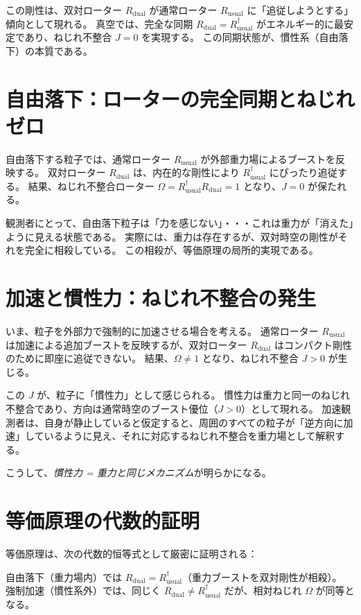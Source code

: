 \documentclass[dvipdfmx,a4paper]{jsbook}
\theoremstyle{definition}
\theoremstyle{remark}
\begin{document}
この剛性は、双対ローター $R_\text{dual}$ が通常ローター $R_\text{usual}$ に「追従しようとする」傾向として現れる。  
真空では、完全な同期 $R_\text{dual} = R_\text{usual}^\dagger$ がエネルギー的に最安定であり、ねじれ不整合 $J = 0$ を実現する。  
この同期状態が、慣性系（自由落下）の本質である。

\section{自由落下：ローターの完全同期とねじれゼロ}
\label{sec:free-fall}

自由落下する粒子では、通常ローター $R_\text{usual}$ が外部重力場によるブーストを反映する。  
双対ローター $R_\text{dual}$ は、内在的な剛性により $R_\text{usual}^\dagger$ にぴったり追従する。  
結果、ねじれ不整合ローター $\Omega = R_\text{usual}^\dagger R_\text{dual} = 1$ となり、$J = 0$ が保たれる。  

観測者にとって、自由落下粒子は「力を感じない」・・・これは重力が「消えた」ように見える状態である。  
実際には、重力は存在するが、双対時空の剛性がそれを完全に相殺している。  
この相殺が、等価原理の局所的実現である。

\section{加速と慣性力：ねじれ不整合の発生}
\label{sec:acceleration-inertia}

いま、粒子を外部力で強制的に加速させる場合を考える。  
通常ローター $R_\text{usual}$ は加速による追加ブーストを反映するが、双対ローター $R_\text{dual}$ はコンパクト剛性のために即座に追従できない。  
結果、$\Omega \neq 1$ となり、ねじれ不整合 $J > 0$ が生じる。  

この $J$ が、粒子に「慣性力」として感じられる。  
慣性力は重力と同一のねじれ不整合であり、方向は通常時空のブースト優位（$J > 0$）として現れる。  
加速観測者は、自身が静止していると仮定すると、周囲のすべての粒子が「逆方向に加速」しているように見え、それに対応するねじれ不整合を重力場として解釈する。  

こうして、\emph{慣性力 = 重力と同じメカニズム}が明らかになる。

\section{等価原理の代数的証明}
\label{sec:equivalence-algebraic}

等価原理は、次の代数的恒等式として厳密に証明される：  

自由落下（重力場内）では $R_\text{dual} = R_\text{usual}^\dagger$（重力ブーストを双対剛性が相殺）。  
強制加速（慣性系外）では、同じく $R_\text{dual} \neq R_\text{usual}^\dagger$ だが、相対ねじれ $\Omega$ が同等となる。  
\end{document}
